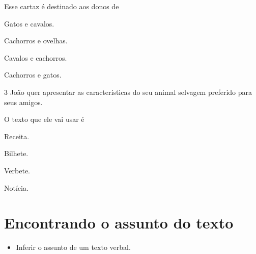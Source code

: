 Esse cartaz é destinado aos donos de 

\begin{escolha}
	\item Gatos e cavalos.

	\item Cachorros e ovelhas.

	\item Cavalos e cachorros.

	\item Cachorros e gatos.
\end{escolha}

\num{3} João quer apresentar as características do seu animal selvagem
preferido para seus amigos.

O texto que ele vai usar é

\begin{escolha}
	\item Receita.

	\item Bilhete.

	\item Verbete.

	\item Notícia.
\end{escolha}

\chapter{Encontrando o assunto do texto}

\vspace*{-1cm}
\enlargethispage{2\baselineskip}


\begin{itemize}
\item Inferir o assunto de um texto verbal.
\end{itemize}


